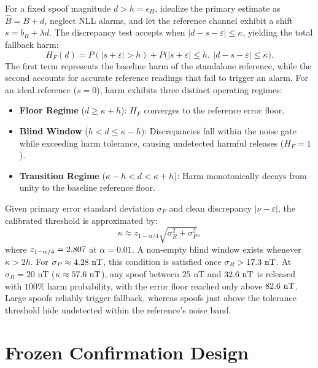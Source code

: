 \documentclass[conference]{IEEEtran}
\newcommand{\Bhat}{\widehat{B}}
\begin{document}
For a fixed spoof magnitude $d > h = \epsilon_H$, idealize the primary estimate as $\Bhat = B + d$, neglect NLL alarms, and let the reference channel exhibit a shift $s = b_R + \lambda d$. The discrepancy test accepts when $|d - s - \varepsilon| \le \kappa$, yielding the total fallback harm:
\begin{equation}
 H_F(d)=P(|s+\varepsilon|>h)
 +P\bigl(|s+\varepsilon|\le h,\ |d-s-\varepsilon|\le\kappa\bigr).
 \label{eq:closed}
\end{equation}
The first term represents the baseline harm of the standalone reference, while the second accounts for accurate reference readings that fail to trigger an alarm. For an ideal reference ($s = 0$), harm exhibits three distinct operating regimes:
\begin{itemize}
\item \textbf{Floor Regime} ($d \ge \kappa + h$): $H_F$ converges to the reference error floor.
\item \textbf{Blind Window} ($h < d \le \kappa - h$): Discrepancies fall within the noise gate while exceeding harm tolerance, causing undetected harmful releases ($H_F = 1$).
\item \textbf{Transition Regime} ($\kappa - h < d < \kappa + h$): Harm monotonically decays from unity to the baseline reference floor.
\end{itemize}

Given primary error standard deviation $\sigma_P$ and clean discrepancy $|\nu - \varepsilon|$, the calibrated threshold is approximated by:
\begin{equation}
 \kappa\approx z_{1-\alpha/4}\sqrt{\sigma_R^2+\sigma_P^2},
 \label{eq:kappa}
\end{equation}
where $z_{1-\alpha/4} = 2.807$ at $\alpha = 0.01$. A non-empty blind window exists whenever $\kappa > 2h$. For $\sigma_P \approx 4.28\text{~nT}$, this condition is satisfied once $\sigma_R > 17.3\text{~nT}$. At $\sigma_R = 20\text{~nT}$ ($\kappa \approx 57.6\text{~nT}$), any spoof between $25\text{~nT}$ and $32.6\text{~nT}$ is released with $100\%$ harm probability, with the error floor reached only above $82.6\text{~nT}$. Large spoofs reliably trigger fallback, whereas spoofs just above the tolerance threshold hide undetected within the reference's noise band.

\section{Frozen Confirmation Design}
\label{sec:design}
\end{document}
